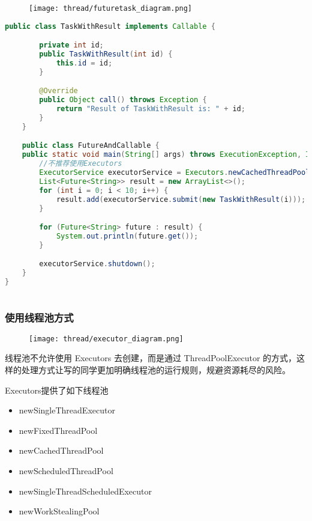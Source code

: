 \begin{figure}[H]
    \centering
    \texttt{[image: thread/futuretask\_diagram.png]}
\end{figure}


\begin{lstlisting}[language=java]
    public class TaskWithResult implements Callable {

        private int id;
        public TaskWithResult(int id) {
            this.id = id;
        }

        @Override
        public Object call() throws Exception {
            return "Result of TaskWithResult is: " + id;
        }
    }

    public class FutureAndCallable {
    public static void main(String[] args) throws ExecutionException, InterruptedException {
        //不推荐使用Executors
        ExecutorService executorService = Executors.newCachedThreadPool();
        List<Future<String>> result = new ArrayList<>();
        for (int i = 0; i < 10; i++) {
            result.add(executorService.submit(new TaskWithResult(i)));
        }

        for (Future<String> future : result) {
            System.out.println(future.get());
        }

        executorService.shutdown();
    }
}



\end{lstlisting}


\subsubsection{使用线程池方式}

\begin{figure}[H]
    \centering
    \texttt{[image: thread/executor\_diagram.png]}
\end{figure}

线程池不允许使用 Executors 去创建，而是通过 ThreadPoolExecutor 的方式，这样的处理方式让写的同学更加明确线程池的运行规则，规避资源耗尽的风险。

Executors提供了如下线程池

\begin{itemize}
    \item newSingleThreadExecutor
    \item newFixedThreadPool
    \item newCachedThreadPool
    \item newScheduledThreadPool
    \item newSingleThreadScheduledExecutor
    \item newWorkStealingPool
\end{itemize}

